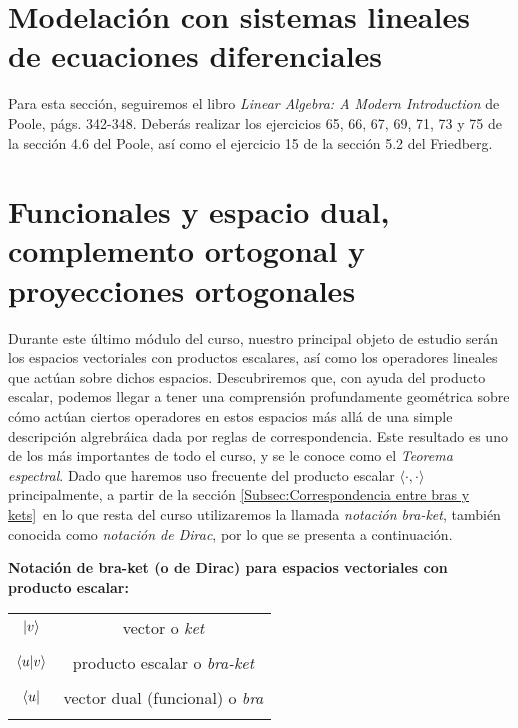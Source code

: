 \documentclass[12pt,libertine]{book}
\begin{document}
\newpage
\section{Modelación con sistemas lineales de ecuaciones diferenciales} \label{Sec:Modelación con sistemas lineales de ecuaciones diferenciales} 
Para esta sección, seguiremos el libro \emph{Linear Algebra: A Modern Introduction} de Poole, págs. 342-348. Deberás realizar los ejercicios 65, 66, 67, 69, 71, 73 y 75 de la sección 4.6 del Poole, así como el ejercicio 15 de la sección 5.2 del Friedberg.



\section{Funcionales y espacio dual, complemento ortogonal y proyecciones ortogonales} \label{Sec:13} 

Durante este último módulo del curso, nuestro principal objeto de estudio serán los espacios vectoriales con productos escalares, así como los operadores lineales que actúan sobre dichos espacios. Descubriremos que, con ayuda del producto escalar, podemos llegar a tener una comprensión profundamente geométrica sobre cómo actúan ciertos operadores en estos espacios \textemdash más allá de una simple descripción algrebráica dada por reglas de correspondencia. Este resultado es uno de los más importantes de todo el curso, y se le conoce como el \emph{Teorema espectral}. Dado que haremos uso frecuente del producto escalar  $\langle\cdot ,\cdot\rangle$ \textemdash principalmente, a partir de la sección \ref{Subsec:Correspondencia entre bras y kets}\textemdash \ en lo que resta del curso utilizaremos la llamada \emph{notación bra-ket}, también conocida como \emph{notación de Dirac}, por lo que se presenta a continuación.

\vspace{3mm}

\textbf{Notación de bra-ket (o de Dirac) para espacios vectoriales con producto escalar:}
\begin{tcolorbox}
    \centering
    \begin{tabular}{cc}
        \\
        $\ket{v}$ & vector o \emph{ket}  \\ \\
        $\braket{u|v}$ & producto escalar o \emph{bra-ket}  \\ \\
        $\bra{u}$ & vector dual (funcional) o \emph{bra} \\ \\
    \end{tabular}
\end{tcolorbox}
\end{document}
